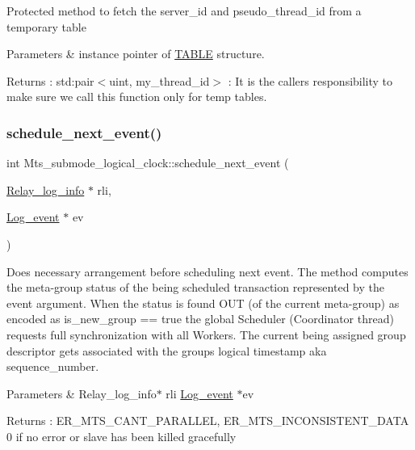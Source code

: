 Protected method to fetch the server\+\_\+id and pseudo\+\_\+thread\+\_\+id from a temporary table 
\begin{DoxyParams}{Parameters}
{\em } & instance pointer of \mbox{\hyperlink{structTABLE}{T\+A\+B\+LE}} structure. \\
\hline
\end{DoxyParams}
\begin{DoxyReturn}{Returns}
\+: std\+:pair$<$uint, my\+\_\+thread\+\_\+id$>$  \+: It is the caller\textquotesingle{}s responsibility to make sure we call this function only for temp tables. 
\end{DoxyReturn}
\mbox{\label{classMts__submode__logical__clock_a7e2a78af961009a44eacddd88b0f517f}} 
\subsubsection{\texorpdfstring{schedule\+\_\+next\+\_\+event()}{schedule\_next\_event()}}
{\footnotesize\ttfamily int Mts\+\_\+submode\+\_\+logical\+\_\+clock\+::schedule\+\_\+next\+\_\+event (\begin{DoxyParamCaption}\item[{\mbox{\hyperlink{classRelay__log__info}{Relay\+\_\+log\+\_\+info}} $\ast$}]{rli,  }\item[{\mbox{\hyperlink{classLog__event}{Log\+\_\+event}} $\ast$}]{ev }\end{DoxyParamCaption})\hspace{0.3cm}{\ttfamily [virtual]}}

Does necessary arrangement before scheduling next event. The method computes the meta-\/group status of the being scheduled transaction represented by the event argument. When the status is found O\+UT (of the current meta-\/group) as encoded as is\+\_\+new\+\_\+group == true the global Scheduler (Coordinator thread) requests full synchronization with all Workers. The current being assigned group descriptor gets associated with the group\textquotesingle{}s logical timestamp aka sequence\+\_\+number.


\begin{DoxyParams}{Parameters}
{\em } & Relay\+\_\+log\+\_\+info$\ast$ rli \mbox{\hyperlink{classLog__event}{Log\+\_\+event}} $\ast$ev \\
\hline
\end{DoxyParams}
\begin{DoxyReturn}{Returns}
\+: E\+R\+\_\+\+M\+T\+S\+\_\+\+C\+A\+N\+T\+\_\+\+P\+A\+R\+A\+L\+L\+EL, E\+R\+\_\+\+M\+T\+S\+\_\+\+I\+N\+C\+O\+N\+S\+I\+S\+T\+E\+N\+T\+\_\+\+D\+A\+TA 0 if no error or slave has been killed gracefully 
\end{DoxyReturn}


